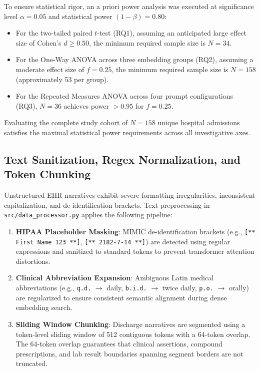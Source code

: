 \documentclass[11pt, a4paper]{article}
\begin{document}
To ensure statistical rigor, an a priori power analysis was executed at significance level $\alpha = 0.05$ and statistical power $(1 - \beta) = 0.80$:
\begin{itemize}
  \item For the two-tailed paired $t$-test (RQ1), assuming an anticipated large effect size of Cohen's $d \ge 0.50$, the minimum required sample size is $N = 34$.
  \item For the One-Way ANOVA across three embedding groups (RQ2), assuming a moderate effect size of $f = 0.25$, the minimum required sample size is $N = 158$ (approximately 53 per group).
  \item For the Repeated Measures ANOVA across four prompt configurations (RQ3), $N = 36$ achieves power $> 0.95$ for $f = 0.25$.
\end{itemize}
Evaluating the complete study cohort of $N = 158$ unique hospital admissions satisfies the maximal statistical power requirements across all investigative axes.

\subsection{Text Sanitization, Regex Normalization, and Token Chunking}
Unstructured EHR narratives exhibit severe formatting irregularities, inconsistent capitalization, and de-identification brackets. Text preprocessing in \texttt{src/data\_processor.py} applies the following pipeline:
\begin{enumerate}
  \item \textbf{HIPAA Placeholder Masking}: MIMIC de-identification brackets (e.g., \texttt{[*{*} First Name 123 *{*}]}, \texttt{[*{*} 2182-7-14 *{*}]}) are detected using regular expressions and sanitized to standard tokens to prevent transformer attention distortions.
  \item \textbf{Clinical Abbreviation Expansion}: Ambiguous Latin medical abbreviations (e.g., \texttt{q.d.} $\to$ daily, \texttt{b.i.d.} $\to$ twice daily, \texttt{p.o.} $\to$ orally) are regularized to ensure consistent semantic alignment during dense embedding search.
  \item \textbf{Sliding Window Chunking}: Discharge narratives are segmented using a token-level sliding window of 512 contiguous tokens with a 64-token overlap. The 64-token overlap guarantees that clinical assertions, compound prescriptions, and lab result boundaries spanning segment borders are not truncated.
\end{enumerate}
\end{document}
